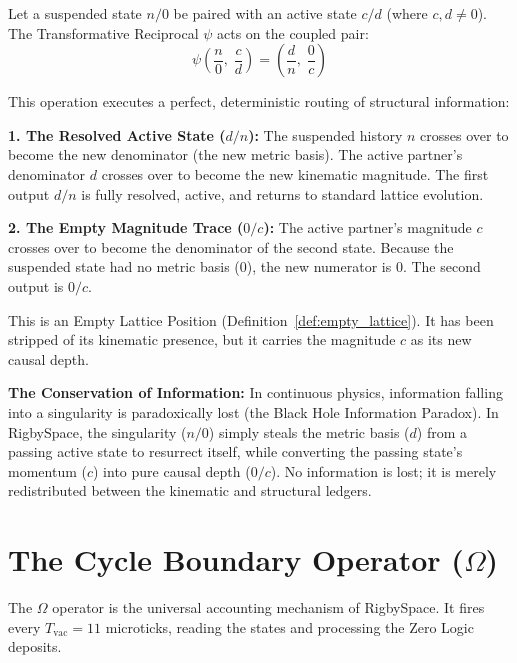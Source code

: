 \documentclass[11pt, letterpaper]{article}
\newcommand{\Tvac}{T_{\mathrm{vac}}}
\newcommand{\psiop}{\psi}
\begin{document}
\begin{theorem}\label{thm:zero_resolution}
\begin{rsbox}
Let a suspended state $n/0$ be paired with an active state $c/d$ (where $c, d \neq 0$).
The Transformative Reciprocal $\psiop$ acts on the coupled pair:
\[ \psiop\left(\frac{n}{0},\; \frac{c}{d}\right) = \left(\frac{d}{n},\; \frac{0}{c}\right) \]

This operation executes a perfect, deterministic routing of structural information:

\textbf{1. The Resolved Active State ($d/n$):}
The suspended history $n$ crosses over to become the new denominator (the new metric basis). The active partner's denominator $d$ crosses over to become the new kinematic magnitude. The first output $d/n$ is fully resolved, active, and returns to standard lattice evolution.

\textbf{2. The Empty Magnitude Trace ($0/c$):}
The active partner's magnitude $c$ crosses over to become the denominator of the second state. Because the suspended state had no metric basis ($0$), the new numerator is $0$. The second output is $0/c$. 

This is an Empty Lattice Position (Definition~\ref{def:empty_lattice}). It has been stripped of its kinematic presence, but it carries the magnitude $c$ as its new causal depth.
\end{rsbox}
\end{theorem}

\begin{observebox}
\textbf{The Conservation of Information:}
In continuous physics, information falling into a singularity is paradoxically lost (the Black Hole Information Paradox). In RigbySpace, the singularity ($n/0$) simply steals the metric basis ($d$) from a passing active state to resurrect itself, while converting the passing state's momentum ($c$) into pure causal depth ($0/c$). No information is lost; it is merely redistributed between the kinematic and structural ledgers.
\end{observebox}

\section{The Cycle Boundary Operator ($\Omega$)}

The $\Omega$ operator is the universal accounting mechanism of RigbySpace. It fires every $\Tvac = 11$ microticks, reading the states and processing the Zero Logic deposits.
\end{document}
